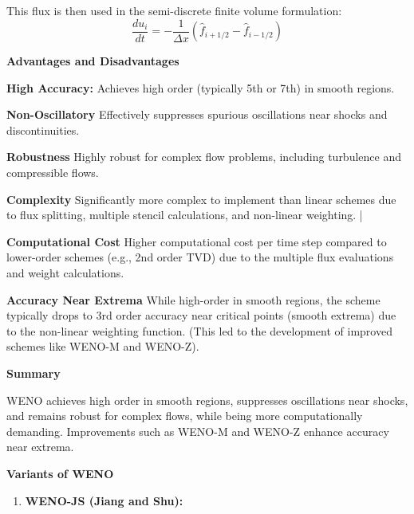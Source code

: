 \documentclass[10pt,a4paper]{article}
\begin{document}
\begin{description}
\begin{description}
\begin{enumerate}
This flux is then used in the semi-discrete finite volume formulation:
$$\frac{d u_i}{d t} = -\frac{1}{\Delta x} (\hat{f}_{i+1/2} - \hat{f}_{i-1/2})$$

\end{enumerate}
\item \textbf{ Advantages and Disadvantages}

\begin{description}

\item \textbf{High Accuracy:} Achieves high order (typically 5th or 7th) in smooth regions.

\item \textbf{Non-Oscillatory} Effectively suppresses spurious oscillations near shocks and discontinuities. 

\item \textbf{Robustness} Highly robust for complex flow problems, including turbulence and compressible flows. 

\item \textbf{Complexity} Significantly more complex to implement than linear schemes due to flux splitting, multiple stencil calculations, and non-linear weighting. |

\item \textbf{Computational Cost} Higher computational cost per time step compared to lower-order schemes (e.g., 2nd order TVD) due to the multiple flux evaluations and weight calculations. 

\item \textbf{Accuracy Near Extrema} While high-order in smooth regions, the scheme typically drops to 3rd order accuracy near critical points (smooth extrema) due to the non-linear weighting function. (This led to the development of improved schemes like WENO-M and WENO-Z). 

\item \textbf{Summary} 

WENO achieves high order in smooth regions, suppresses oscillations near shocks, and remains robust for complex flows, while being more computationally demanding. Improvements such as WENO-M and WENO-Z enhance accuracy near extrema.

\end{description}

\item \textbf{Variants of WENO}\cite{current}

\begin{enumerate}
\item \textbf{WENO-JS (Jiang and Shu):} 


\end{enumerate}
\end{description}
\end{description}
\end{document}
